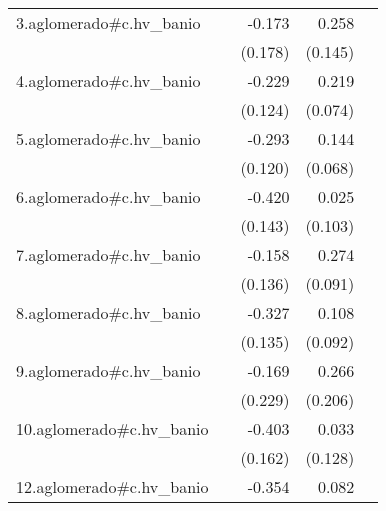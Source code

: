 {\begin{longtable}{l*{4}{D{.}{.}{-1}}}
\addlinespace
3.aglomerado#c.hv\_banio&                     &      -0.173         &       0.258         &                     \\
            &                     &     (0.178)         &     (0.145)         &                     \\
\addlinespace
4.aglomerado#c.hv\_banio&                     &      -0.229         &       0.219\sym{**} &                     \\
            &                     &     (0.124)         &     (0.074)         &                     \\
\addlinespace
5.aglomerado#c.hv\_banio&                     &      -0.293\sym{*}  &       0.144\sym{*}  &                     \\
            &                     &     (0.120)         &     (0.068)         &                     \\
\addlinespace
6.aglomerado#c.hv\_banio&                     &      -0.420\sym{**} &       0.025         &                     \\
            &                     &     (0.143)         &     (0.103)         &                     \\
\addlinespace
7.aglomerado#c.hv\_banio&                     &      -0.158         &       0.274\sym{**} &                     \\
            &                     &     (0.136)         &     (0.091)         &                     \\
\addlinespace
8.aglomerado#c.hv\_banio&                     &      -0.327\sym{*}  &       0.108         &                     \\
            &                     &     (0.135)         &     (0.092)         &                     \\
\addlinespace
9.aglomerado#c.hv\_banio&                     &      -0.169         &       0.266         &                     \\
            &                     &     (0.229)         &     (0.206)         &                     \\
\addlinespace
10.aglomerado#c.hv\_banio&                     &      -0.403\sym{*}  &       0.033         &                     \\
            &                     &     (0.162)         &     (0.128)         &                     \\
\addlinespace
12.aglomerado#c.hv\_banio&                     &      -0.354\sym{*}  &       0.082         &                     \\

\end{longtable}}
